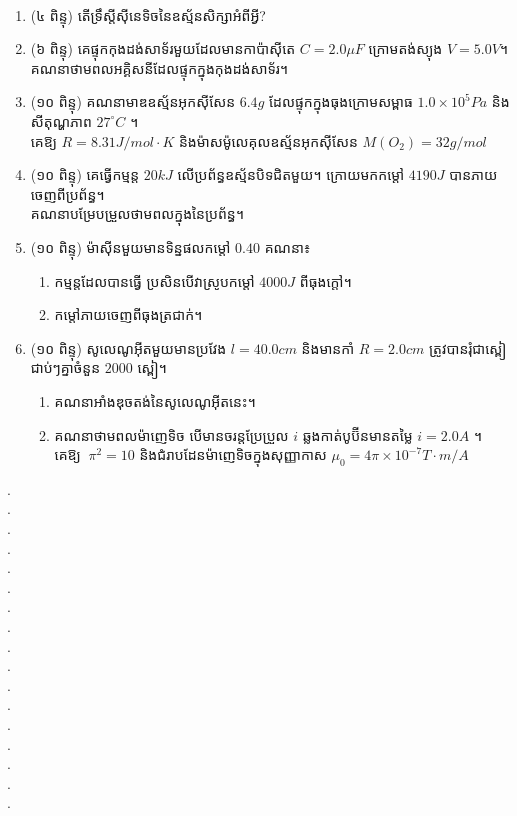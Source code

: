 \documentclass{officialexam}
\begin{document}
	\maketitle\\
	\begin{enumerate}[I]
		\item (៤ ពិន្ទុ) តើទ្រឹស្តីសុីនេទិចនៃឧស្ម័នសិក្សាអំពីអ្វី?
		\item (៦ ពិន្ទុ) គេផ្ទុកកុងដង់សាទ័រមួយដែលមានកាប៉ាសុីតេ $C=2.0\mu F$ ក្រោមតង់ស្យុង $V=5.0V$។\\ គណនាថាមពលអគ្គិសនីដែលផ្ទុកក្នុងកុងដង់សាទ័រ។
		\item (១០ ពិន្ទុ) គណនាមាឌឧស្ម័នអុកសុីសែន $6.4g$ ដែលផ្ទុកក្នុងធុងក្រោមសម្ពាធ $1.0\times10^{5}Pa$ និងសីតុណ្ហភាព $27^\circ C$ ។ \\គេឱ្យ $R=8.31J/mol\cdot K$ និងម៉ាសម៉ូលេគុលឧស្ម័នអុកសុីសែន $M(O_2)=32g/mol$
		\item (១០ ពិន្ទុ) គេធ្វើកម្មន្ត $20kJ$ លើប្រព័ន្ធឧស្ម័នបិទជិតមួយ។ ក្រោយមកកម្តៅ $4190J$ បានភាយចេញពីប្រព័ន្ធ។ \\គណនាបម្រែបម្រួលថាមពលក្នុងនៃប្រព័ន្ធ។
		\item (១០ ពិន្ទុ) ម៉ាសុីនមួយមានទិន្នផលកម្តៅ $0.40$ គណនា៖
		\begin{enumerate}[k]
			\item កម្មន្តដែលបានធ្វើ ប្រសិនបើវាស្រូបកម្ដៅ $4000J$ ពីធុងក្តៅ។
			\item កម្តៅភាយចេញពីធុងត្រជាក់។
		\end{enumerate} 
		\item (១០ ពិន្ទុ) សូលេណូអុីតមួយមានប្រវែង $l=40.0cm$ និងមានកាំ $R=2.0cm$ ត្រូវបានរុំជា​​ស្ពៀ​​​​ជាប់ៗ​​គ្នាចំនួន $2000$ ស្ពៀ។
		\begin{enumerate}[k]
			\item គណនាអាំងឌុចតង់នៃសូលេណូអុីតនេះ។
			\item គណនាថាមពលម៉ាញេទិច បើមានចរន្តប្រែប្រួល $i$ ឆ្លងកាត់បូប៊ីនមានតម្លៃ $i=2.0A$ ។\\ គេឱ្យ $~\pi^2=10$ និងជំរាបដែនម៉ាញេទិចក្នុងសុញ្ញាកាស $\mu_0=4\pi\times10^{-7}T\cdot m/A$
		\end{enumerate} 
	\end{enumerate}
{\color{white}.}\dotfill\\
{\color{white}.}\dotfill\\
{\color{white}.}\dotfill
\\
{\color{white}.}\dotfill\\
{\color{white}.}\dotfill\\
{\color{white}.}\dotfill
\\
{\color{white}.}\dotfill\\
{\color{white}.}\dotfill\\
{\color{white}.}\dotfill
\\
{\color{white}.}\dotfill\\
{\color{white}.}\dotfill\\
{\color{white}.}\dotfill
\\
{\color{white}.}\dotfill\\
{\color{white}.}\dotfill\\
{\color{white}.}\dotfill
\\
{\color{white}.}\dotfill\\
{\color{white}.}\dotfill
\end{document}
